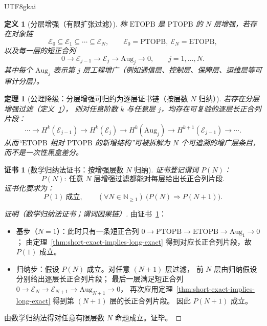 \documentclass[12pt]{article}
\newtheorem{definition}{定义}[section]
\newtheorem{theorem}{定理}[section]
\newtheorem{Certificate}{证书}[section]
\newcommand{\NN}{\mathbb{N}}
\newcommand{\PTOPB}{\ensuremath{\mathrm{PTOPB}}}
\newcommand{\ETOPB}{\ensuremath{\mathrm{ETOPB}}}
\newcommand{\Aug}{\ensuremath{\mathrm{Aug}}}
\begin{document}
\begin{CJK*}{UTF8}{gkai}
\begin{definition}[分层增强（有限扩张过滤）]
\label{def:layered-augmentation-filtration}
称 \ETOPB{} 是 \PTOPB{} 的 $N$ 层增强，若存在对象链
\[
  \mathcal{E}_0 \subseteq \mathcal{E}_1 \subseteq \cdots \subseteq \mathcal{E}_N,
  \qquad
  \mathcal{E}_0=\PTOPB,\ \mathcal{E}_N=\ETOPB,
\]
以及每一层的短正合列
\[
  0\longrightarrow \mathcal{E}_{j-1}\longrightarrow \mathcal{E}_j \longrightarrow \Aug_j \longrightarrow 0,
  \qquad j=1,\dots,N.
\]
其中每个 $\Aug_j$ 表示第 $j$ 层工程增广（例如通信层、控制层、保障层、运维层等可审计分层）。
\end{definition}

\begin{theorem}[公理降级：分层增强可归约为逐层证书链（按层数 $N$ 归纳）]
\label{thm:layered-augmentation-by-induction}
若存在分层增强过滤（定义~\ref{def:layered-augmentation-filtration}），
则对任意阶数 $k$ 与任意层 $j$，均存在可复验的逐层长正合列片段：
\[
  \cdots
  \to H^k(\mathcal{E}_{j-1})
  \to H^k(\mathcal{E}_j)
  \to H^k(\Aug_j)
  \to H^{k+1}(\mathcal{E}_{j-1})
  \to \cdots .
\]
从而“\ETOPB{} 相对 \PTOPB{} 的新增结构”可被拆解为 $N$ 个可追溯的增广层条目，而不是一次性黑盒差分。
\end{theorem}

\begin{Certificate}[数学归纳法证书：按增强层数 $N$ 归纳]
\label{cert:layered-augmentation-by-induction}
证书登记谓词 $P(N)$：
\[
  P(N):\ \text{任意 $N$ 层增强过滤都能对每层给出长正合列片段}.
\]
证书化要求为：
\[
  P(1)\ \text{成立},\qquad
  (\forall N\in\NN_{\ge 1})\ \bigl(P(N)\Rightarrow P(N+1)\bigr).
\]
\end{Certificate}

\begin{proof}[证明（数学归纳法证书；谓词因果链）]
由证书~\ref{cert:layered-augmentation-by-induction}：
\begin{itemize}
  \item 基步（$N=1$）：此时只有一条短正合列 $0\to\PTOPB\to\ETOPB\to\Aug_1\to 0$；
  由定理~\ref{thm:short-exact-implies-long-exact} 得到对应长正合列片段，故 $P(1)$ 成立。
  \item 归纳步：假设 $P(N)$ 成立。对任意 $(N+1)$ 层过滤，
  前 $N$ 层由归纳假设分别给出逐层长正合列片段；
  最后一层满足短正合列 $0\to \mathcal{E}_N\to \mathcal{E}_{N+1}\to \Aug_{N+1}\to 0$，
  再次应用定理~\ref{thm:short-exact-implies-long-exact} 得到第 $(N+1)$ 层的长正合列片段。
  因此 $P(N+1)$ 成立。
\end{itemize}
由数学归纳法得对任意有限层数 $N$ 命题成立。证毕。
\end{proof}


\end{CJK*}
\end{document}
